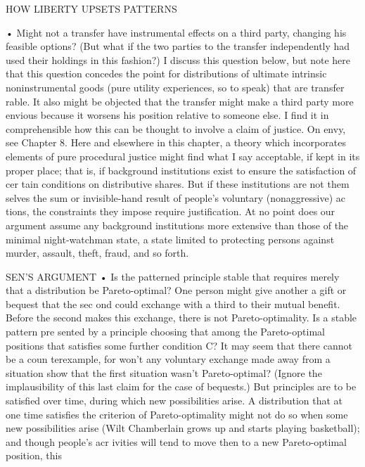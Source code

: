 \documentclass[11pt,openany]{book}
\begin{document}
{HOW LIBERTY UPSETS PATTERNS\par

• Might not a transfer have instrumental effects on a third party, changing his feasible options? (But what if the two parties to the transfer independently had used their holdings in this fashion?) I discuss this question below, but note here that this question concedes the point for distributions of ultimate intrinsic noninstrumental goods (pure utility experiences, so to speak) that are transfer rable. It also might be objected that the transfer might make a third party more envious because it worsens his position relative to someone else. I find it in comprehensible how this can be thought to involve a claim of justice. On envy, see Chapter 8. Here and elsewhere in this chapter, a theory which incorporates elements of pure procedural justice might find what I say acceptable, if kept in its proper place; that is, if background institutions exist to ensure the satisfaction of cer tain conditions on distributive shares. But if these institutions are not them selves the sum or invisible-hand result of people's voluntary (nonaggressive) ac tions, the constraints they impose require justification. At no point does our argument assume any background institutions more extensive than those of the minimal night-watchman state, a state limited to protecting persons against murder, assault, theft, fraud, and so forth.\par

SEN'S ARGUMENT • Is the patterned principle stable that requires merely that a distribution be Pareto-optimal? One person might give another a gift or bequest that the sec ond could exchange with a third to their mutual benefit. Before the second makes this exchange, there is not Pareto-optimality. Is a stable pattern pre sented by a principle choosing that among the Pareto-optimal positions that satisfies some further condition C? It may seem that there cannot be a coun terexample, for won't any voluntary exchange made away from a situation show that the first situation wasn't Pareto-optimal? (Ignore the implausibility of this last claim for the case of bequests.) But principles are to be satisfied over time, during which new possibilities arise. A distribution that at one time satisfies the criterion of Pareto-optimality might not do so when some new possibilities arise (Wilt Chamberlain grows up and starts playing basketball); and though people's acr ivities will tend to move then to a new Pareto-optimal position, this\par

}
\end{document}
